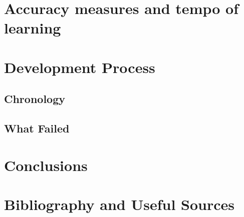 \documentclass{article}
\begin{document}
\section{Accuracy measures and tempo of learning}

\section{Development Process}
\subsection{Chronology}
\subsection{What Failed}

\section{Conclusions}

\section{Bibliography and Useful Sources}
\end{document}
